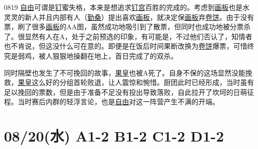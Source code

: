 
0819 \uline{自由}可谓是\uline{钉}蜜失格，本来是想追求\uline{钉宫}百胜的完成的。考虑到\uline{画板}也是水灵灵的新人并且内部有人（\uline{勤桑}）提出喜欢\uline{画板}，就决定保\uline{画板}弃\uline{卷饼}。由于没有票，刷了很多\uline{画板}的AA图，虽然成功地吸引到了散票，但同时也成功地被分票杀了。很显然有人在A，处于之前预选的印象，有可能是，不过他们否认了，知情者也不肯说，但这没什么可在意的。即便是在饭后时间果断改换为\uline{卷饼}爆票，可惜终究是弱鸡，被人狠狠地操翻在地上，首日完成了的双杀。

同时隔壁也发生了不可挽回的故事，\uline{果皇}也被A死了。自身不保的这场显然没能挽救，\uline{果皇}这么好的分组首轮败退，让人震惊和惋惜。厨团此时已经形成，当时虽有足以挽回的票数，但是由于准备不足没有投出导致落败，自此拉开了坎坷的日萌征程。当时赛后内群的轻浮言论，也是\uline{自由}对这一阵营产生不满的开端。

\section{08/20(水) A1-2 B1-2 C1-2 D1-2}

